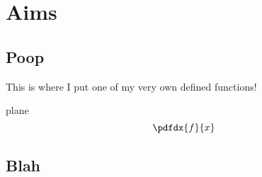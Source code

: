 \chapter{Aims}

\ifpdf
    \graphicspath{{example_chapter/figures/PNG/}{example_chapter/figures/PDF/}{example_chapter/figures/}}
\else
    \graphicspath{{example_chapter/figures/EPS/}{example_chapter/figures/}}
\fi



\section{Poop}
This is where I put one of my very own defined functions!
    
\uv plane
    $$ \pdfdx{f}{x} $$
\section{Blah} 
\lipsum
